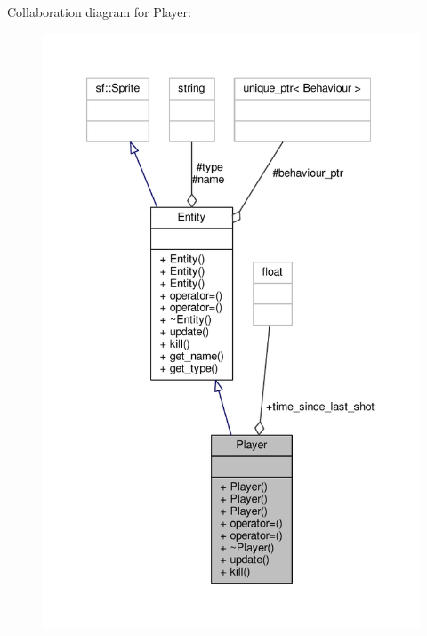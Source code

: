 Collaboration diagram for Player\+:\nopagebreak
\begin{figure}[H]
\begin{center}
\leavevmode
\includegraphics[width=341pt]{classPlayer__coll__graph}
\end{center}
\end{figure}
